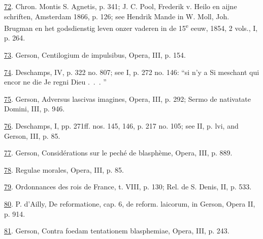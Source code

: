 \protect\hypertarget{23_NOTES.xhtmlux5cux23id_1128}{\protect\hyperlink{13_Chapter_Six__THE_DEPICTION_OF_TH.xhtmlux5cux23id_1127}{72}}.
Chron. Montis S. Agnetis, p. 341; J. C. Pool, Frederik v. Heilo en aijne
schriften, Amsterdam 1866, p. 126; see Hendrik Mande in W. Moll, Joh.
Brugman en het godsdienstig leven onzer vaderen in de
15\textsuperscript{e} eeuw, 1854, 2 vols., I, p. 264.

\protect\hypertarget{23_NOTES.xhtmlux5cux23id_1126}{\protect\hyperlink{13_Chapter_Six__THE_DEPICTION_OF_TH.xhtmlux5cux23id_1125}{73}}.
Gerson, Centilogium de impulsibus, Opera, III, p. 154.

\protect\hypertarget{23_NOTES.xhtmlux5cux23id_1124}{\protect\hyperlink{13_Chapter_Six__THE_DEPICTION_OF_TH.xhtmlux5cux23id_1123}{74}}.
Deschamps, IV, p. 322 no. 807; see I, p. 272 no. 146: ``si n'y a Si
meschant qui encor ne die Je regni Dieu .~.~. ''

\protect\hypertarget{23_NOTES.xhtmlux5cux23id_1122}{\protect\hyperlink{13_Chapter_Six__THE_DEPICTION_OF_TH.xhtmlux5cux23id_1121}{75}}.
Gerson, Adversus lascivas imagines, Opera, III, p. 292; Sermo de
nativatate Domini, III, p. 946.

\protect\hypertarget{23_NOTES.xhtmlux5cux23page_419}{\protect\hyperlink{13_Chapter_Six__THE_DEPICTION_OF_TH.xhtmlux5cux23id_1120}{76}}.
Deschamps, I, pp. 271ff. nos. 145, 146, p. 217 no. 105; see II, p. lvi,
and Gerson, III, p. 85.

\protect\hypertarget{23_NOTES.xhtmlux5cux23id_1119}{\protect\hyperlink{13_Chapter_Six__THE_DEPICTION_OF_TH.xhtmlux5cux23id_1118}{77}}.
Gerson, Considérations sur le peché de blasphème, Opera, III, p. 889.

\protect\hypertarget{23_NOTES.xhtmlux5cux23id_1117}{\protect\hyperlink{13_Chapter_Six__THE_DEPICTION_OF_TH.xhtmlux5cux23id_1116}{78}}.
Regulae morales, Opera, III, p. 85.

\protect\hypertarget{23_NOTES.xhtmlux5cux23id_1115}{\protect\hyperlink{13_Chapter_Six__THE_DEPICTION_OF_TH.xhtmlux5cux23id_1114}{79}}.
Ordonnances des rois de France, t. VIII, p. 130; Rel. de S. Denis, II,
p. 533.

\protect\hypertarget{23_NOTES.xhtmlux5cux23id_1113}{\protect\hyperlink{13_Chapter_Six__THE_DEPICTION_OF_TH.xhtmlux5cux23id_1112}{80}}.
P. d'Ailly, De reformatione, cap. 6, de reform. laicorum, in Gerson,
Opera II, p. 914.

\protect\hypertarget{23_NOTES.xhtmlux5cux23id_1111}{\protect\hyperlink{13_Chapter_Six__THE_DEPICTION_OF_TH.xhtmlux5cux23id_1110}{81}}.
Gerson, Contra foedam tentationem blasphemiae, Opera, III, p. 243.

